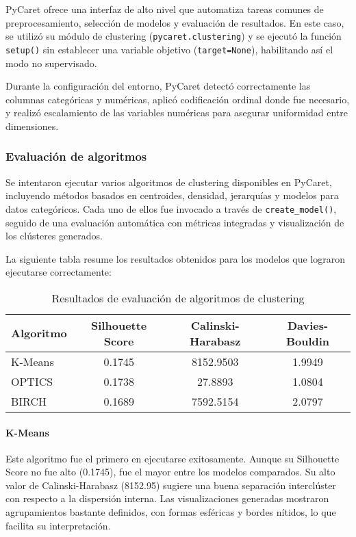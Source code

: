 \documentclass[conference]{IEEEtran}
\begin{document}
PyCaret ofrece una interfaz de alto nivel que automatiza tareas comunes de preprocesamiento, selección de modelos y evaluación de resultados. En este caso, se utilizó su módulo de clustering (\texttt{pycaret.clustering}) y se ejecutó la función \texttt{setup()} sin establecer una variable objetivo (\texttt{target=None}), habilitando así el modo no supervisado.

Durante la configuración del entorno, PyCaret detectó correctamente las columnas categóricas y numéricas, aplicó codificación ordinal donde fue necesario, y realizó escalamiento de las variables numéricas para asegurar uniformidad entre dimensiones.

\subsubsection{Evaluación de algoritmos}

Se intentaron ejecutar varios algoritmos de clustering disponibles en PyCaret, incluyendo métodos basados en centroides, densidad, jerarquías y modelos para datos categóricos. Cada uno de ellos fue invocado a través de \texttt{create\_model()}, seguido de una evaluación automática con métricas integradas y visualización de los clústeres generados.

La siguiente tabla resume los resultados obtenidos para los modelos que lograron ejecutarse correctamente:

\begin{table}[h]
\caption{Resultados de evaluación de algoritmos de clustering}
\centering
\begin{tabular}{|l|c|c|c|}
\hline
\textbf{Algoritmo} & \textbf{Silhouette Score} & \textbf{Calinski-Harabasz} & \textbf{Davies-Bouldin} \\
\hline
K-Means & 0.1745 & 8152.9503 & 1.9949 \\
\hline
OPTICS & 0.1738 & 27.8893 & 1.0804 \\
\hline
BIRCH & 0.1689 & 7592.5154 & 2.0797 \\
\hline
\end{tabular}
\label{tab:clustering_results}
\end{table}

\paragraph{K-Means}
Este algoritmo fue el primero en ejecutarse exitosamente. Aunque su Silhouette Score no fue alto (0.1745), fue el mayor entre los modelos comparados. Su alto valor de Calinski-Harabasz (8152.95) sugiere una buena separación interclúster con respecto a la dispersión interna. Las visualizaciones generadas mostraron agrupamientos bastante definidos, con formas esféricas y bordes nítidos, lo que facilita su interpretación.
\end{document}
